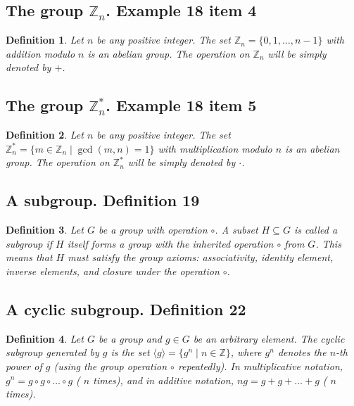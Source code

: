\documentclass{article}
\newtheorem*{customdefinition}{Definition}
\begin{document}
\subsection*{The group \( \mathbb{Z}_n \). Example 18 item 4}
\begin{customdefinition}
Let \( n \) be any positive integer. The set \( \mathbb{Z}_n = \{0, 1, \ldots, n-1\} \) with addition modulo \( n \) is an abelian group. The operation on \( \mathbb{Z}_n \) will be simply denoted by \( + \).
\end{customdefinition}

\subsection*{The group \( \mathbb{Z}^*_n \). Example 18 item 5}
\begin{customdefinition}
Let \( n \) be any positive integer. The set \( \mathbb{Z}^*_n = \{ m \in \mathbb{Z}_n \mid \gcd(m, n) = 1 \} \) with multiplication modulo \( n \) is an abelian group. The operation on \( \mathbb{Z}^*_n \) will be simply denoted by \( \cdot \).
\end{customdefinition}

\subsection*{A subgroup. Definition 19}
\begin{customdefinition}
Let \( G \) be a group with operation \( \circ \). A subset \( H \subseteq G \) is called a subgroup if \( H \) itself forms a group with the inherited operation \( \circ \) from \( G \). This means that \( H \) must satisfy the group axioms: associativity, identity element, inverse elements, and closure under the operation \( \circ \).
\end{customdefinition}

\subsection*{A cyclic subgroup. Definition 22}
\begin{customdefinition}
Let \( G \) be a group and \( g \in G \) be an arbitrary element. The cyclic subgroup generated by \( g \) is the set \( \langle g \rangle = \{ g^n \mid n \in \mathbb{Z} \} \), where \( g^n \) denotes the \( n \)-th power of \( g \) (using the group operation \( \circ \) repeatedly). In multiplicative notation, \( g^n = g \circ g \circ \ldots \circ g \) ( \( n \) times), and in additive notation, \( ng = g + g + \ldots + g \) ( \( n \) times).
\end{customdefinition}
\end{document}
